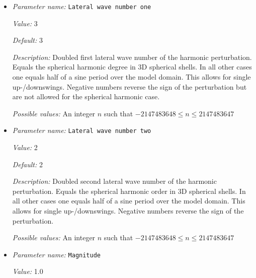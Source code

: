 \begin{itemize}
\item {\it Parameter name:} {\tt Lateral wave number one}
\label{parameters:Initial temperature model/Harmonic perturbation/Lateral wave number one}
\label{parameters:Initial_20temperature_20model/Harmonic_20perturbation/Lateral_20wave_20number_20one}


{\it Value:} 3


{\it Default:} 3


{\it Description:} Doubled first lateral wave number of the harmonic perturbation. Equals the spherical harmonic degree in 3D spherical shells. In all other cases one equals half of a sine period over the model domain. This allows for single up-/downswings. Negative numbers reverse the sign of the perturbation but are not allowed for the spherical harmonic case.


{\it Possible values:} An integer $n$ such that $-2147483648\leq n \leq 2147483647$
\item {\it Parameter name:} {\tt Lateral wave number two}
\label{parameters:Initial temperature model/Harmonic perturbation/Lateral wave number two}
\label{parameters:Initial_20temperature_20model/Harmonic_20perturbation/Lateral_20wave_20number_20two}


{\it Value:} 2


{\it Default:} 2


{\it Description:} Doubled second lateral wave number of the harmonic perturbation. Equals the spherical harmonic order in 3D spherical shells. In all other cases one equals half of a sine period over the model domain. This allows for single up-/downswings. Negative numbers reverse the sign of the perturbation.


{\it Possible values:} An integer $n$ such that $-2147483648\leq n \leq 2147483647$
\item {\it Parameter name:} {\tt Magnitude}
\label{parameters:Initial temperature model/Harmonic perturbation/Magnitude}
\label{parameters:Initial_20temperature_20model/Harmonic_20perturbation/Magnitude}


{\it Value:} 1.0



\end{itemize}
